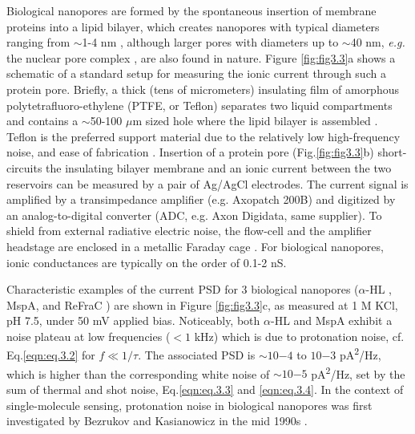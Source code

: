 Biological nanopores are formed by the spontaneous insertion of membrane proteins into a lipid bilayer, which creates nanopores with typical diameters ranging from $\sim$1-4 nm \cite{Ayub2016}, although larger pores with diameters up to $\sim$40 nm, \emph{e.g.} the nuclear pore complex \cite{Yu2018}, are also found in nature. Figure \ref{fig:fig3.3}a shows a schematic of a standard setup for measuring the ionic current through such a protein pore. Briefly, a thick (tens of micrometers) insulating film of amorphous polytetrafluoro-ethylene (PTFE, or Teflon) separates two liquid compartments and contains a $\sim$50-100 $\mu$m sized hole where the lipid bilayer is assembled \cite{Maglia2010,Robertson2013}. Teflon is the preferred support material due to the relatively low high-frequency noise, and ease of fabrication \cite{Mayer2003}. Insertion of a protein pore (Fig.\ref{fig:fig3.3}b) short-circuits the insulating bilayer membrane and an ionic current between the two reservoirs can be measured by a pair of Ag/AgCl electrodes. The current signal is amplified by a transimpedance amplifier (e.g. Axopatch 200B) and digitized by an analog-to-digital converter (ADC, e.g. Axon Digidata, same supplier). To shield from external radiative electric noise, the flow-cell and the amplifier headstage are enclosed in a metallic Faraday cage \cite{Maglia2010}. For biological nanopores, ionic conductances are typically on the order of 0.1-2 nS.


Characteristic examples of the current PSD for 3 biological nanopores ($\alpha$-HL \cite{Song1996}, MspA, and ReFraC \cite{Wloka2016}) are shown in Figure \ref{fig:fig3.3}c, as measured at 1 M KCl, pH 7.5, under 50 mV applied bias. Noticeably, both $\alpha$-HL and MspA exhibit a noise plateau at low frequencies ($< 1$ kHz) which is due to protonation noise, cf. Eq.\ref{eqn:eq.3.2} for $f\ll 1/\tau$. The associated PSD is $\sim10{-4}$ to $10{-3}$ pA\textsuperscript{2}/Hz, which is higher than the corresponding white noise of $\sim 10{-5}$ pA\textsuperscript{2}/Hz, set by the sum of thermal and shot noise, Eq.\ref{eqn:eq.3.3} and \ref{eqn:eq.3.4}. In the context of single-molecule sensing, protonation noise in biological nanopores was first investigated by Bezrukov and Kasianowicz in the mid 1990s \cite{Kasianowicz1993,Kasianowicz1995}.


